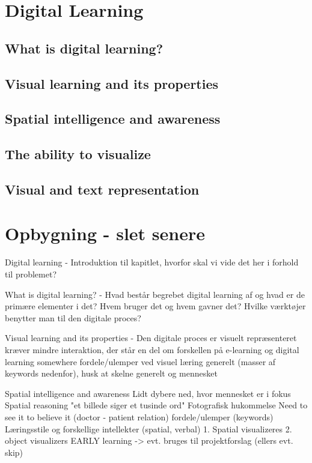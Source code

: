 \section{Digital Learning}\label{ch:digital_learning_ch}
\subsection{What is digital learning?}\label{ch:what_is_digital_learning}
\subsection{Visual learning and its properties}\label{ch:visual_learning_and_its_properties}
\subsection{Spatial intelligence and awareness}\label{ch:spatial_intelligence_and_awareness}
\subsection{The ability to visualize}\label{ch:the_ability_to_visualize}
\subsection{Visual and text representation}\label{ch:spatial_intelligence_and_awareness}

\section{Opbygning - slet senere}\label{ch:opbygning}
Digital learning - Introduktion til kapitlet, hvorfor skal vi vide det her i forhold til problemet?

What is digital learning? - Hvad består begrebet digital learning af og hvad er de primære elementer i det? 
    Hvem bruger det og hvem gavner det? 
    Hvilke værktøjer benytter man til den digitale proces?

  Visual learning and its properties - Den digitale proces er visuelt repræsenteret
    kræver mindre interaktion, der står en del om forskellen på e-learning og digital learning somewhere
    fordele/ulemper ved visuel læring generelt (masser af keywords nedenfor), husk at skelne generelt og mennesket

  Spatial intelligence and awareness
    Lidt dybere ned, hvor mennesket er i fokus
    Spatial reasoning
    "et billede siger et tusinde ord"
    Fotografisk hukommelse
    Need to see it to believe it (doctor - patient relation)
    fordele/ulemper (keywords)
    Læringsstile og forskellige intellekter (spatial, verbal)
    1. Spatial visualizeres 2. object visualizers
    EARLY learning -> evt. bruges til projektforslag (ellers evt. skip)
  

